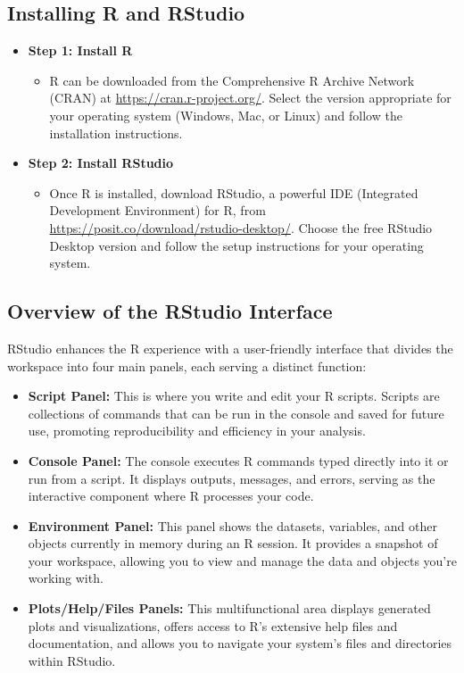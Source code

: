 \documentclass[
]{book}
\providecommand{\tightlist}{%
  \setlength{\itemsep}{0pt}\setlength{\parskip}{0pt}}
\begin{document}
\subsection*{Installing R and RStudio}\label{installing-r-and-rstudio}

\begin{itemize}
\tightlist
\item
  \textbf{Step 1: Install R}

  \begin{itemize}
  \tightlist
  \item
    R can be downloaded from the Comprehensive R Archive Network (CRAN) at \url{https://cran.r-project.org/}. Select the version appropriate for your operating system (Windows, Mac, or Linux) and follow the installation instructions.
  \end{itemize}
\item
  \textbf{Step 2: Install RStudio}

  \begin{itemize}
  \tightlist
  \item
    Once R is installed, download RStudio, a powerful IDE (Integrated Development Environment) for R, from \url{https://posit.co/download/rstudio-desktop/}. Choose the free RStudio Desktop version and follow the setup instructions for your operating system.
  \end{itemize}
\end{itemize}

\subsection*{Overview of the RStudio Interface}\label{overview-of-the-rstudio-interface}

RStudio enhances the R experience with a user-friendly interface that divides the workspace into four main panels, each serving a distinct function:

\begin{itemize}
\item
  \textbf{Script Panel:} This is where you write and edit your R scripts. Scripts are collections of commands that can be run in the console and saved for future use, promoting reproducibility and efficiency in your analysis.
\item
  \textbf{Console Panel:} The console executes R commands typed directly into it or run from a script. It displays outputs, messages, and errors, serving as the interactive component where R processes your code.
\item
  \textbf{Environment Panel:} This panel shows the datasets, variables, and other objects currently in memory during an R session. It provides a snapshot of your workspace, allowing you to view and manage the data and objects you're working with.
\item
  \textbf{Plots/Help/Files Panels:} This multifunctional area displays generated plots and visualizations, offers access to R's extensive help files and documentation, and allows you to navigate your system's files and directories within RStudio.
\end{itemize}
\end{document}
